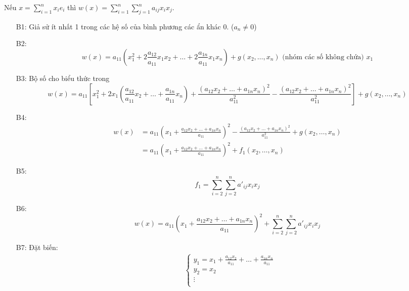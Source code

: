 \begin{enumerate}
    Nếu $x = \sum_{i=1}^n x_i e_i$ thì $w(x) = \sum_{i=1}^n \sum_{j=1}^n a_{ij}x_ix_j$.
    \begin{enumerate}
        \item[B1:] Giả sử ít nhất 1 trong các hệ số của bình phương các ẩn khác 0. ($a_{n} \neq 0$)
        \item[B2:] \begin{equation*}
            w(x) = a_{11}\left(x_1^2 + 2\frac{a_{12}}{a_{11}}x_1x_2 + \ldots + 2\frac{a_{1n}}{a_{11}}x_1x_n \right) + g(x_2, \ldots, x_n) \text{ (nhóm các số không chứa) } x_1
        \end{equation*}
        \item[B3:] Bộ số cho biểu thức trong 
        \begin{equation*}
            w(x) = a_{11}\left[x_1^2 + 2x_1 \left( \frac{a_{12}}{a_{11}}x_2 + \ldots + \frac{a_{1n}}{a_{11}}x_n \right)+ \frac{(a_{12}x_2 + \ldots + a_{1n}x_n)^2}{a_{11}^2} - \frac{(a_{12}x_2 + \ldots + a_{1n}x_n)^2}{a_{11}^2} \right] + g(x_2, \ldots, x_n)
        \end{equation*}
        \item[B4:] \begin{align*}
            w(x) &= a_{11}\left(x_1 + \frac{a_{12}x_2 + \ldots + a_{1n}x_n}{a_{11}}\right)^2 - \frac{(a_{12}x_2 + \ldots + a_{1n}x_n)^2}{a_{11}^2} + g(x_2, \ldots, x_n)\\
            &= a_{11}\left(x_1 + \frac{a_{12}x_2 + \ldots + a_{1n}x_n}{a_{11}}\right)^2 + f_1(x_2, \ldots, x_n)
        \end{align*}
        \item[B5:] \begin{equation*}
            f_1 = \sum_{i=2}^n \sum_{j=2}^n a'_{ij}x_ix_j
        \end{equation*}
        \item[B6:] \begin{equation*}
            w(x) = a_{11}\left(x_1 + \frac{a_{12}x_2 + \ldots + a_{1n}x_n}{a_{11}}\right)^2 + \sum_{i=2}^n \sum_{j=2}^n a'_{ij}x_ix_j
        \end{equation*}
        \item[B7:] Đặt biến: \begin{align*}
            &\begin{cases}
                y_1 = x_1 + \frac{a_{12}x_2}{a_{11}} + \ldots + \frac{a_{1n}x_n}{a_{11}}\\
                y_2 = x_2\\
                \vdots\\

\end{cases}
\end{align*}
\end{enumerate}
\end{enumerate}
